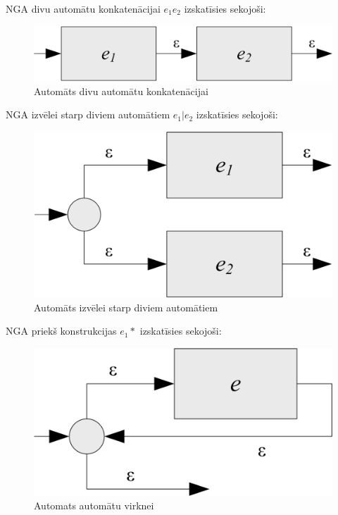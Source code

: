 NGA divu automātu konkatenācijai $e_1 e_2$  izskatīsies sekojoši:
\begin{figure}[h]
  \centering
    \includegraphics[scale=1.5]{pictures/auto_sequence_1}
  \caption{\label{fig:auto_sequence}Automāts divu automātu konkatenācijai}
\end{figure}

NGA izvēlei starp diviem automātiem $e_1 | e_2$ izskatīsies sekojoši:
\begin{figure}[h]
  \centering
    \includegraphics[scale=1.5]{pictures/auto_or_1}
  \caption{\label{fig:auto_or}Automāts izvēlei starp diviem automātiem}
\end{figure}

NGA priekš konstrukcijas $e_1 *$ izskatīsies sekojoši:
\begin{figure}[h]
  \centering
    \includegraphics[scale=1.5]{pictures/auto_asterisk_1}
  \caption{\label{fig:auto_asterisk}Automats automātu virknei}
\end{figure}


